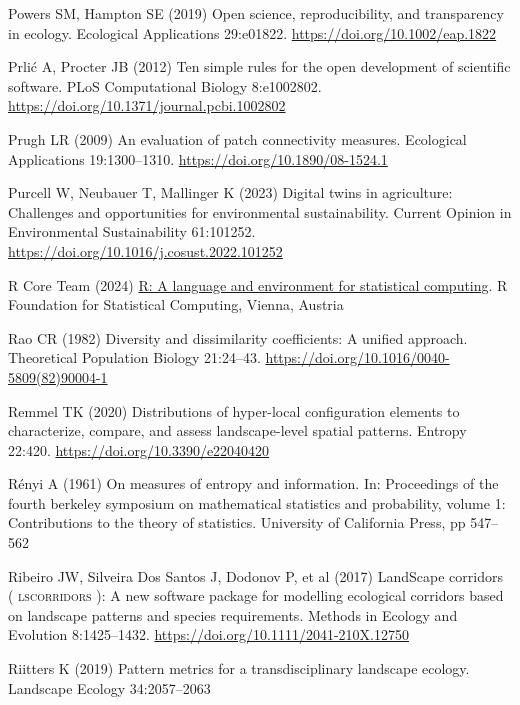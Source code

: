 \documentclass[
  10pt,
  a4paperpaper,
]{article}
\newlength{\cslhangindent}
\newenvironment{CSLReferences}[2] %
 {\begin{list}{}{%
  \setlength{\itemindent}{0pt}
  \setlength{\leftmargin}{0pt}
  \setlength{\parsep}{0pt}
  \ifodd #1
   \setlength{\leftmargin}{\cslhangindent}
   \setlength{\itemindent}{-1\cslhangindent}
  \fi
  \setlength{\itemsep}{#2\baselineskip}}}
 {\end{list}}
\begin{document}
\begin{CSLReferences}{1}{1}
Powers SM, Hampton SE (2019) Open science, reproducibility, and
transparency in ecology. Ecological Applications 29:e01822.
\url{https://doi.org/10.1002/eap.1822}

Prlić A, Procter JB (2012) Ten simple rules for the open development of
scientific software. PLoS Computational Biology 8:e1002802.
\url{https://doi.org/10.1371/journal.pcbi.1002802}

Prugh LR (2009) An evaluation of patch connectivity measures. Ecological
Applications 19:1300--1310. \url{https://doi.org/10.1890/08-1524.1}

Purcell W, Neubauer T, Mallinger K (2023) Digital twins in agriculture:
Challenges and opportunities for environmental sustainability. Current
Opinion in Environmental Sustainability 61:101252.
\url{https://doi.org/10.1016/j.cosust.2022.101252}

R Core Team (2024) \href{https://www.R-project.org/}{R: A language and
environment for statistical computing}. R Foundation for Statistical
Computing, Vienna, Austria

Rao CR (1982) Diversity and dissimilarity coefficients: A unified
approach. Theoretical Population Biology 21:24--43.
\url{https://doi.org/10.1016/0040-5809(82)90004-1}

Remmel TK (2020) Distributions of hyper-local configuration elements to
characterize, compare, and assess landscape-level spatial patterns.
Entropy 22:420. \url{https://doi.org/10.3390/e22040420}

Rényi A (1961) On measures of entropy and information. In: Proceedings
of the fourth berkeley symposium on mathematical statistics and
probability, volume 1: Contributions to the theory of statistics.
University of California Press, pp 547--562

Ribeiro JW, Silveira Dos Santos J, Dodonov P, et al (2017) LandScape
corridors ( {\textsc{lscorridors}} ): A new software package for
modelling ecological corridors based on landscape patterns and species
requirements. Methods in Ecology and Evolution 8:1425--1432.
\url{https://doi.org/10.1111/2041-210X.12750}

Riitters K (2019) Pattern metrics for a transdisciplinary landscape
ecology. Landscape Ecology 34:2057--2063


\end{CSLReferences}
\end{document}
